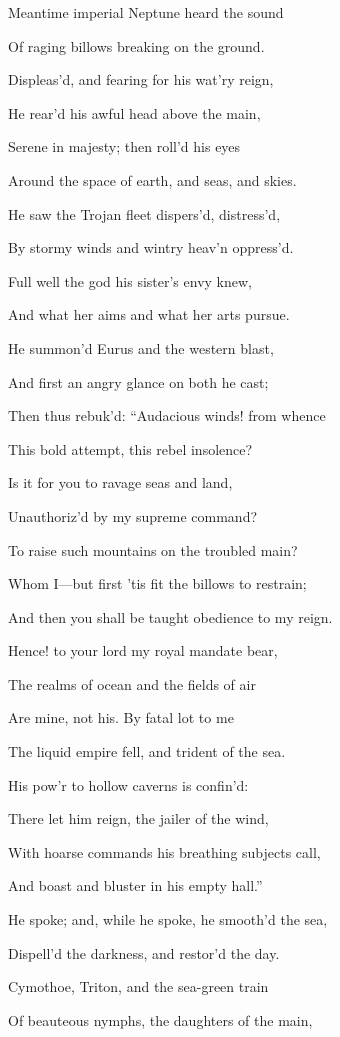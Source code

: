 Meantime imperial Neptune heard the sound

Of raging billows breaking on the ground.

Displeas’d, and fearing for his wat’ry reign,

He rear’d his awful head above the main,

Serene in majesty; then roll’d his eyes

Around the space of earth, and seas, and skies.

He saw the Trojan fleet dispers’d, distress’d,

By stormy winds and wintry heav’n oppress’d.

Full well the god his sister’s envy knew,

And what her aims and what her arts pursue.

He summon’d Eurus and the western blast,

And first an angry glance on both he cast;

Then thus rebuk’d: “Audacious winds! from whence

This bold attempt, this rebel insolence?

Is it for you to ravage seas and land,

Unauthoriz’d by my supreme command?

To raise such mountains on the troubled main?

Whom I—but first ’tis fit the billows to restrain;

And then you shall be taught obedience to my reign.

Hence! to your lord my royal mandate bear,

The realms of ocean and the fields of air

Are mine, not his. By fatal lot to me

The liquid empire fell, and trident of the sea.

His pow’r to hollow caverns is confin’d:

There let him reign, the jailer of the wind,

With hoarse commands his breathing subjects call,

And boast and bluster in his empty hall.”

He spoke; and, while he spoke, he smooth’d the sea,

Dispell’d the darkness, and restor’d the day.

Cymothoe, Triton, and the sea-green train

Of beauteous nymphs, the daughters of the main,

